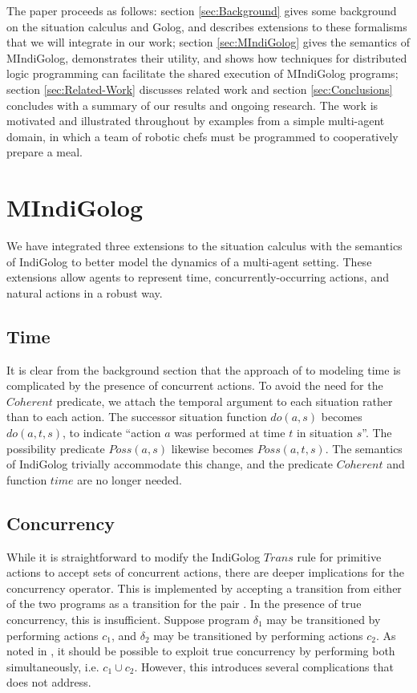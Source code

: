 The paper proceeds as follows: section \ref{sec:Background} gives
some background on the situation calculus and Golog, and describes
extensions to these formalisms that we will integrate in our work;
section \ref{sec:MIndiGolog} gives the semantics of MIndiGolog, demonstrates
their utility, and shows how techniques for distributed logic programming
can facilitate the shared execution of MIndiGolog programs; section
\ref{sec:Related-Work} discusses related work and section \ref{sec:Conclusions}
concludes with a summary of our results and ongoing research. The
work is motivated and illustrated throughout by examples from a simple
multi-agent domain, in which a team of robotic chefs must be programmed
to cooperatively prepare a meal.


\section{MIndiGolog\label{sec:MIndiGolog}}

We have integrated three extensions to the situation calculus with
the semantics of IndiGolog to better model the dynamics of a multi-agent
setting. These extensions allow agents to represent time, concurrently-occurring
actions, and natural actions in a robust way.


\subsection{Time}

It is clear from the background section that the approach of \cite{reiter96sc_nat_conc}
to modeling time is complicated by the presence of concurrent actions.
To avoid the need for the $Coherent$ predicate, we attach the temporal
argument to each situation rather than to each action. The successor
situation function $do(a,s)$ becomes $do(a,t,s)$, to indicate {}``action
$a$ was performed at time $t$ in situation $s$''. The possibility
predicate $Poss(a,s)$ likewise becomes $Poss(a,t,s)$. The semantics
of IndiGolog trivially accommodate this change, and the predicate
$Coherent$ and function $time$ are no longer needed.


\subsection{Concurrency}

While it is straightforward to modify the IndiGolog $Trans$ rule
for primitive actions to accept sets of concurrent actions, there
are deeper implications for the concurrency operator. This is implemented
by accepting a transition from either of the two programs as a transition
for the pair \cite{giacomo00congolog}. In the presence of true concurrency,
this is insufficient. Suppose program $\delta_{1}$ may be transitioned
by performing actions $c_{1}$, and $\delta_{2}$ may be transitioned
by performing actions $c_{2}$. As noted in \cite{pinto99tcongolog},
it should be possible to exploit true concurrency by performing both
simultaneously, i.e. $c_{1}\cup c_{2}$. However, this introduces
several complications that \cite{pinto99tcongolog} does not address.

